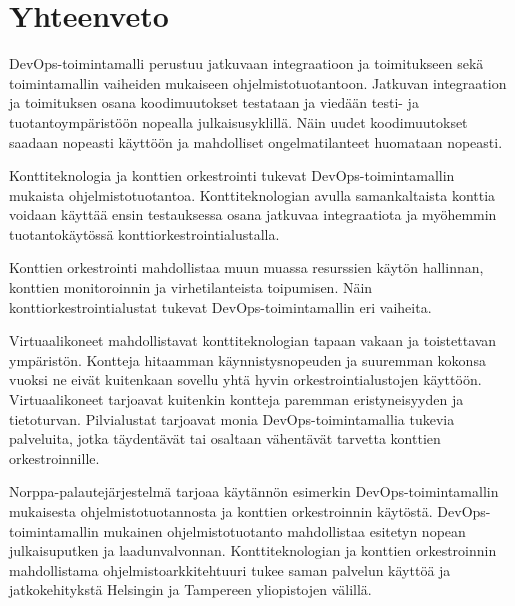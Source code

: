 \chapter{Yhteenveto\label{summary}}

DevOps-toimintamalli perustuu jatkuvaan integraatioon ja toimitukseen sekä toimintamallin vaiheiden mukaiseen ohjelmistotuotantoon.
Jatkuvan integraation ja toimituksen osana koodimuutokset testataan ja viedään testi- ja tuotantoympäristöön nopealla julkaisusyklillä.
Näin uudet koodimuutokset saadaan nopeasti käyttöön ja mahdolliset ongelmatilanteet huomataan nopeasti.

Konttiteknologia ja konttien orkestrointi tukevat DevOps-toimintamallin mukaista ohjelmistotuotantoa.
Konttiteknologian avulla samankaltaista konttia voidaan käyttää ensin testauksessa osana jatkuvaa integraatiota ja myöhemmin tuotantokäytössä konttiorkestrointialustalla.

Konttien orkestrointi mahdollistaa muun muassa resurssien käytön hallinnan, konttien monitoroinnin ja virhetilanteista toipumisen.
Näin konttiorkestrointialustat tukevat DevOps-toimintamallin eri vaiheita.

Virtuaalikoneet mahdollistavat konttiteknologian tapaan vakaan ja toistettavan ympäristön.
Kontteja hitaamman käynnistysnopeuden ja suuremman kokonsa vuoksi ne eivät kuitenkaan sovellu yhtä hyvin orkestrointialustojen käyttöön.
Virtuaalikoneet tarjoavat kuitenkin kontteja paremman eristyneisyyden ja tietoturvan.
Pilvialustat tarjoavat monia DevOps-toimintamallia tukevia palveluita, jotka täydentävät tai osaltaan vähentävät tarvetta konttien orkestroinnille.

Norppa-palautejärjestelmä tarjoaa käytännön esimerkin DevOps-toimintamallin mukaisesta ohjelmistotuotannosta ja konttien orkestroinnin käytöstä.
DevOps-toimintamallin mukainen ohjelmistotuotanto mahdollistaa esitetyn nopean julkaisuputken ja laadunvalvonnan.
Konttiteknologian ja konttien orkestroinnin mahdollistama ohjelmistoarkkitehtuuri tukee saman palvelun käyttöä ja jatkokehitykstä Helsingin ja Tampereen yliopistojen välillä.
